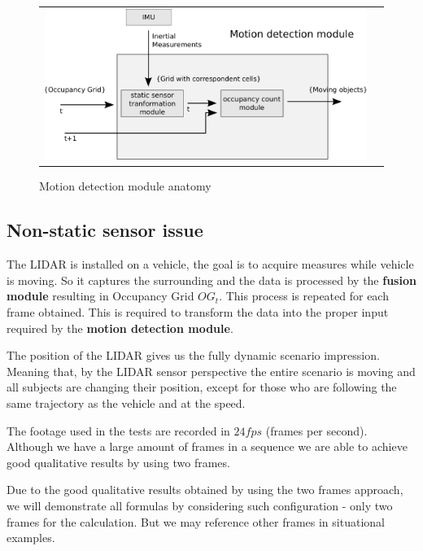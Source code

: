 \begin{figure}[h]
   \centering
     \begin{tabular}{lr}
       \includegraphics[scale=0.50]{img/fig:motion:framework:motionmodule}
     \end{tabular}
   \caption{Motion detection module anatomy}
   \label{fig:motion:framework:motionmodule}
\end{figure}



\subsection{Non-static sensor issue}

The LIDAR is installed on a vehicle, the goal is to acquire measures while vehicle is moving. So it captures the surrounding and the data is processed by the \textbf{fusion module} resulting in Occupancy Grid $OG_t$. This process is repeated for each frame obtained. This is required to transform the data into the proper input required by the \textbf{motion detection module}.

The position of the LIDAR gives us the fully dynamic scenario impression. Meaning that, by the LIDAR sensor perspective the entire scenario is moving and all subjects are changing their position, except for those who are following the same trajectory as the vehicle and at the speed. 

The footage used in the tests are recorded in $24fps$ (frames per second). Although we have a large amount of frames in a sequence we are able to achieve good qualitative results by using two frames. 

Due to the good qualitative results obtained by using the two frames approach, we will demonstrate all formulas by considering such configuration - only two frames for the calculation. But we may reference other frames in situational examples.


